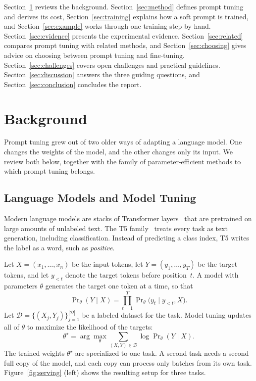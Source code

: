 \documentclass[12pt]{article}
\newcommand{\data}{\mathcal{D}}
\begin{document}
Section~\ref{sec:background} reviews the background. Section~\ref{sec:method} defines prompt
tuning and derives its cost, Section~\ref{sec:training} explains how a soft prompt is trained,
and Section~\ref{sec:example} works through one training step by hand.
Section~\ref{sec:evidence} presents the experimental evidence. Section~\ref{sec:related}
compares prompt tuning with related methods, and Section~\ref{sec:choosing} gives advice on
choosing between prompt tuning and fine-tuning. Section~\ref{sec:challenges} covers open
challenges and practical guidelines. Section~\ref{sec:discussion} answers the three guiding
questions, and Section~\ref{sec:conclusion} concludes the report.

\section{Background}\label{sec:background}

Prompt tuning grew out of two older ways of adapting a language model. One changes the
weights of the model, and the other changes only its input. We review both below, together
with the family of parameter-efficient methods to which prompt tuning belongs.

\subsection{Language Models and Model Tuning}\label{sec:modeltuning}

Modern language models are stacks of Transformer layers~\cite{vaswani2017} that are
pretrained on large amounts of unlabeled text. The T5 family~\cite{raffel2020} treats every
task as text generation, including classification. Instead of predicting a class index, T5
writes the label as a word, such as \emph{positive}.

Let $X=(x_1,\dots,x_n)$ be the input tokens, let $Y=(y_1,\dots,y_T)$ be the target tokens,
and let $y_{<t}$ denote the target tokens before position~$t$. A model with parameters
$\theta$ generates the target one token at a time, so that
\begin{equation}
  \Pr\nolimits_\theta(Y\mid X)=\prod_{t=1}^{T}\Pr\nolimits_\theta\bigl(y_t\mid y_{<t},X\bigr).
  \label{eq:autoregressive}
\end{equation}
Let $\data=\{(X_j,Y_j)\}_{j=1}^{|\data|}$ be a labeled dataset for the task. Model tuning
updates all of $\theta$ to maximize the likelihood of the targets:
\begin{equation}
  \theta^{\star}=\arg\max_{\theta}\sum_{(X,Y)\in\data}\log\Pr\nolimits_\theta(Y\mid X).
  \label{eq:modeltuning}
\end{equation}
The trained weights $\theta^{\star}$ are specialized to one task. A second task needs
a second full copy of the model, and each copy can process only batches from its own task.
Figure~\ref{fig:serving} (left) shows the resulting setup for three tasks.
\end{document}
